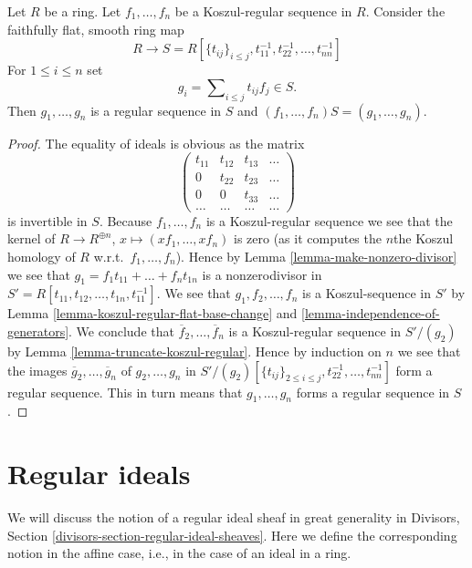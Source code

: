 \begin{lemma}
\label{lemma-Koszul-regular-flat-locally-regular}
Let $R$ be a ring. Let $f_1, \ldots, f_n$ be a Koszul-regular sequence
in $R$. Consider the faithfully flat, smooth ring map
$$
R \longrightarrow
S = R[\{t_{ij}\}_{i \leq j}, t_{11}^{-1}, t_{22}^{-1}, \ldots, t_{nn}^{-1}]
$$
For $1 \leq i \leq n$ set
$$
g_i = \sum\nolimits_{i \leq j} t_{ij} f_j \in S.
$$
Then $g_1, \ldots, g_n$ is a regular sequence in $S$ and
$(f_1, \ldots, f_n)S = (g_1, \ldots, g_n)$.
\end{lemma}

\begin{proof}
The equality of ideals is obvious as the matrix
$$
\left(
\begin{matrix}
t_{11} & t_{12} & t_{13} & \ldots \\
0 & t_{22} & t_{23} & \ldots \\
0 & 0 & t_{33} & \ldots \\
\ldots & \ldots & \ldots & \ldots
\end{matrix}
\right)
$$
is invertible in $S$.
Because $f_1, \ldots, f_n$ is a Koszul-regular sequence we see that
the kernel of
$R \to R^{\oplus n}$, $x \mapsto (xf_1, \ldots, xf_n)$ is zero (as it
computes the $n$the Koszul homology of $R$ w.r.t.\ $f_1, \ldots, f_n$).
Hence by
Lemma \ref{lemma-make-nonzero-divisor}
we see that $g_1 = f_1 t_{11} + \ldots + f_n t_{1n}$ is a nonzerodivisor
in $S' = R[t_{11}, t_{12}, \ldots, t_{1n}, t_{11}^{-1}]$. We see that
$g_1, f_2, \ldots, f_n$ is a Koszul-sequence in $S'$ by
Lemma \ref{lemma-koszul-regular-flat-base-change} and
\ref{lemma-independence-of-generators}.
We conclude that
$\overline{f}_2, \ldots, \overline{f}_n$ is a Koszul-regular sequence
in $S'/(g_2)$ by
Lemma \ref{lemma-truncate-koszul-regular}.
Hence by induction on $n$ we see that the images
$\overline{g}_2, \ldots, \overline{g}_n$ of $g_2, \ldots, g_n$ in
$S'/(g_2)[\{t_{ij}\}_{2 \leq i \leq j}, t_{22}^{-1}, \ldots, t_{nn}^{-1}]$
form a regular sequence. This in turn means that
$g_1, \ldots, g_n$ forms a regular sequence in $S$.
\end{proof}






\section{Regular ideals}
\label{section-ideals}

\noindent
We will discuss the notion of a regular ideal sheaf in great generality in
Divisors, Section \ref{divisors-section-regular-ideal-sheaves}.
Here we define the corresponding notion in the affine case, i.e., in
the case of an ideal in a ring.

